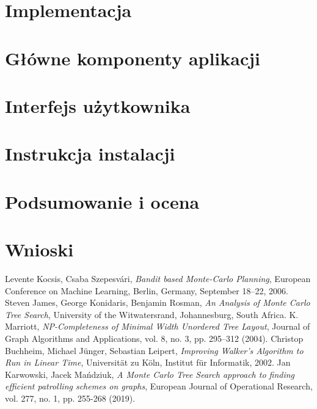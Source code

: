 \documentclass[a4paper,11pt,twoside]{report}
\theoremstyle{definition}
\begin{document}
\chapter{Implementacja} \label{chap:impl}


\chapter{Główne komponenty aplikacji} \label{chap:glowne_komp}


\chapter{Interfejs użytkownika} \label{chap:ui}


\chapter{Instrukcja instalacji} \label{chap:insr_instalacji}


\chapter{Podsumowanie i ocena} \label{chap:podsumowanie}


\chapter{Wnioski} \label{chap:wnioski}



\begin{thebibliography}{20}%
 Levente Kocsis, Csaba Szepesvári, \emph{Bandit based Monte-Carlo Planning}, European Conference on Machine Learning, Berlin, Germany, September 18--22, 2006.
 Steven James, George Konidaris, Benjamin Rosman, \emph{An Analysis of Monte Carlo Tree Search}, University of the Witwatersrand, Johannesburg, South Africa.
 K. Marriott, \emph{NP-Completeness of Minimal Width Unordered Tree Layout}, Journal of Graph Algorithms and Applications, vol. 8, no. 3, pp. 295--312 (2004).
 Christop Buchheim, Michael Jünger, Sebastian Leipert, \emph{Improving Walker's Algorithm to Run in Linear Time}, Universität zu Köln, Institut für Informatik, 2002.
 Jan Karwowski, Jacek Mańdziuk, \emph{A Monte Carlo Tree Search approach to finding efficient patrolling schemes on graphs}, European Journal of Operational Research, vol. 277, no. 1, pp. 255-268 (2019).
\end{thebibliography}
\end{document}
